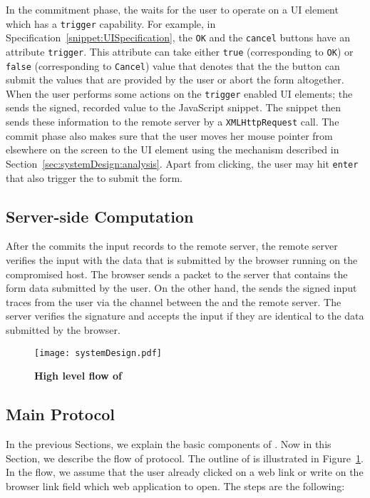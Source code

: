  In the commitment phase, the \device waits for the user to operate on a UI element which has a \texttt{trigger} capability. For example, in Specification~\ref{snippet:UISpecification}, the \texttt{OK} and the \texttt{cancel} buttons have an attribute \texttt{trigger}. This attribute can take either \texttt{true} (corresponding to \texttt{OK}) or \texttt{false} (corresponding to \texttt{Cancel}) value that denotes that the the button can submit the values that are provided by the user or abort the form altogether. When the user performs some actions on the \texttt{trigger} enabled UI elements; the \device sends the signed, recorded value to the \name JavaScript snippet. The \name \js snippet then sends these information to the remote server by a \texttt{XMLHttpRequest} call. The commit phase also makes sure that the user moves her mouse pointer from elsewhere on the screen to the UI element using the \pop mechanism described in Section~\ref{sec:systemDesign:analysis}. Apart from clicking, the user may hit \texttt{enter} that also trigger the \device to submit the form. 


\subsection{Server-side Computation}
\label{sec:systemDesign:serverSide}

After the \device commits the input records to the remote server, the remote server verifies the input with the data that is submitted by the browser running on the compromised host. The browser sends a \http packet to the server that contains the form data submitted by the user. On the other hand, the \device sends the signed input traces from the user via the \tls channel between the \device and the remote server. The server verifies the signature and accepts the input if they are identical to the data submitted by the browser.

\begin{figure}[t]
\centering
\texttt{[image: systemDesign.pdf]}
\caption{\textbf{High level flow of \name}}
\label{fig:systemDesign}
\centering
\end{figure}

\subsection{Main Protocol}
\label{sec:systemDesign:mainProtocol}

In the previous Sections, we explain the basic components of \name. Now in this Section, we describe the flow of \name protocol. The outline of \name is illustrated in Figure~\ref{fig:systemDesign}. In the flow, we assume that the user already clicked on a web link or write on the browser link field which web application to open. The steps are the following:


